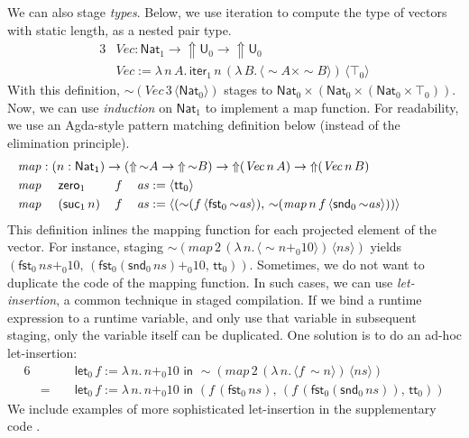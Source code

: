 \documentclass[acmsmall,screen]{acmart}
\newcommand{\mit}[1]{\mathit{#1}}
\newcommand{\msf}[1]{\mathsf{#1}}
\newcommand{\Lift}{{\Uparrow}}
\newcommand{\spl}{{\sim}}
\newcommand{\qut}[1]{\langle #1\rangle}
\newcommand{\U}{\msf{U}}
\newcommand{\Nat}{\msf{Nat}}
\newcommand{\zero}{\msf{zero}}
\newcommand{\suc}{\msf{suc}}
\renewcommand{\tt}{\msf{tt}}
\newcommand{\fst}{\msf{fst}}
\newcommand{\snd}{\msf{snd}}
\newcommand{\mylet}{\msf{let}}
\theoremstyle{remark}
\begin{document}
We can also stage \emph{types}. Below, we use iteration to compute the type of
vectors with static length, as a nested pair type.
\begin{alignat*}{3}
  &\mit{Vec} : \Nat_1 \to \Lift \U_0 \to \Lift \U_0\\
  &\mit{Vec} := \lambda\,n\,A.\,\msf{iter}_1\,n\,(\lambda\,B.\,\qut{\spl A \times \spl B})\,\qut{\top_0}
\end{alignat*}
With this definition, $\spl(\mit{Vec}\,3\,\qut{\Nat_0})$ stages to $\Nat_0
\times (\Nat_0 \times (\Nat_0 \times \top_0))$. Now, we can use \emph{induction}
on $\Nat_1$ to implement a map function. For readability, we use an Agda-style
pattern matching definition below (instead of the elimination principle).
\begin{alignat*}{6}
  &\hspace{-3em}\rlap{$\mit{map} : (n : \Nat_1) \to (\Lift\,\spl A \to \Lift\,\spl B) \to \Lift(\mit{Vec}\,n\,A) \to \Lift(\mit{Vec}\,n\,B)$}\\
  &\hspace{-3em}\mit{map}\,\,&&\zero_1      && f\,&&\mit{as} := \qut{\tt_0}\\
  &\hspace{-3em}\mit{map}\,\,&&(\suc_1\,n)\,&& f\,&&\mit{as} :=
     \qut{(\spl(f\,\qut{\fst_0\,\spl\mit{as}}),\,\spl(\mit{map}\,n\,f\,\qut{\snd_0\,\spl \mit{as}}))}
\end{alignat*}
This definition inlines the mapping function for each projected element of the
vector. For instance, staging $\spl(\mit{map}\,2\,(\lambda\,n.\,\qut{\spl n +_0
  10})\,\qut{\mit{ns}})$ yields $(\fst_0\,\mit{ns} +_0
10,\,(\fst_0(\snd_0\,\mit{ns}) +_0 10,\,\tt_0))$. Sometimes, we do not want to
duplicate the code of the mapping function. In such cases, we can use
\emph{let-insertion}, a common technique in staged compilation. If we bind a runtime
expression to a runtime variable, and only use that variable in subsequent
staging, only the variable itself can be duplicated. One solution is to do an
ad-hoc let-insertion:
\begin{alignat*}{6}
  &   && \mylet_0\,f := \lambda\,n.\, n +_0 10\,\,\msf{in}\,\,
         \spl(\mit{map}\,2\,(\lambda\,n.\,\qut{f\,\spl n})\,\qut{\mit{ns}}) \\
  & =\,\,&&  \mylet_0\,f := \lambda\,n.\, n +_0 10\,\,\msf{in}\,\,
          (f\,(\fst_0\,\mit{ns}),\,(f\,(\fst_0(\snd_0\,\mit{ns})),\,\tt_0))
\end{alignat*}
We include examples of more sophisticated let-insertion in the supplementary
code \cite{staged-demo}.
\end{document}
